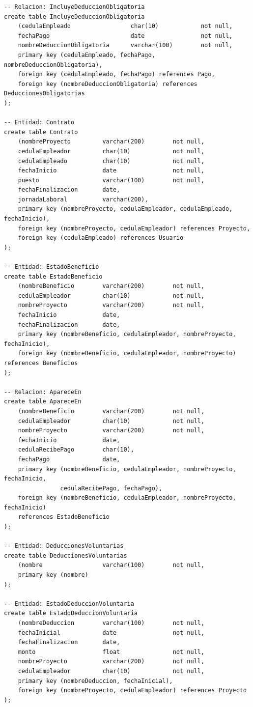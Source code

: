 \documentclass{article}
\begin{document}
\begin{verbatim}
-- Relacion: IncluyeDeduccionObligatoria
create table IncluyeDeduccionObligatoria
    (cedulaEmpleado                 char(10)            not null,
    fechaPago                       date                not null,
    nombreDeduccionObligatoria      varchar(100)        not null,
    primary key (cedulaEmpleado, fechaPago, nombreDeduccionObligatoria),
    foreign key (cedulaEmpleado, fechaPago) references Pago,
    foreign key (nombreDeduccionObligatoria) references DeduccionesObligatorias
);

-- Entidad: Contrato
create table Contrato
    (nombreProyecto         varchar(200)        not null,
    cedulaEmpleador         char(10)            not null,
    cedulaEmpleado          char(10)            not null,
    fechaInicio             date                not null,
    puesto                  varchar(100)        not null,
    fechaFinalizacion       date,
    jornadaLaboral          varchar(200),
    primary key (nombreProyecto, cedulaEmpleador, cedulaEmpleado, fechaInicio),
    foreign key (nombreProyecto, cedulaEmpleador) references Proyecto,
    foreign key (cedulaEmpleado) references Usuario
);

-- Entidad: EstadoBeneficio
create table EstadoBeneficio
    (nombreBeneficio        varchar(200)        not null,
    cedulaEmpleador         char(10)            not null,
    nombreProyecto          varchar(200)        not null,
    fechaInicio             date,
    fechaFinalizacion       date,
    primary key (nombreBeneficio, cedulaEmpleador, nombreProyecto, fechaInicio),
    foreign key (nombreBeneficio, cedulaEmpleador, nombreProyecto) references Beneficios
);

-- Relacion: ApareceEn
create table ApareceEn
    (nombreBeneficio        varchar(200)        not null,
    cedulaEmpleador         char(10)            not null,
    nombreProyecto          varchar(200)        not null,
    fechaInicio             date,
    cedulaRecibePago        char(10),
    fechaPago               date,
    primary key (nombreBeneficio, cedulaEmpleador, nombreProyecto, fechaInicio,
                cedulaRecibePago, fechaPago),
    foreign key (nombreBeneficio, cedulaEmpleador, nombreProyecto, fechaInicio)
    references EstadoBeneficio
);

-- Entidad: DeduccionesVoluntarias
create table DeduccionesVoluntarias
    (nombre                 varchar(100)        not null,
    primary key (nombre)
);

-- Entidad: EstadoDeduccionVoluntaria
create table EstadoDeduccionVoluntaria
    (nombreDeduccion        varchar(100)        not null,
    fechaInicial            date                not null,
    fechaFinalizacion       date,
    monto                   float               not null,
    nombreProyecto          varchar(200)        not null,
    cedulaEmpleador         char(10)            not null,
    primary key (nombreDeduccion, fechaInicial),
    foreign key (nombreProyecto, cedulaEmpleador) references Proyecto
);


\end{verbatim}
\end{document}
